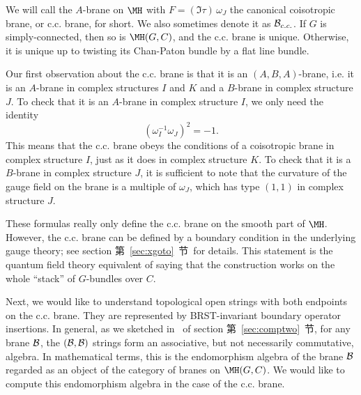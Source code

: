 We will call the $A$-brane on $\MH$ with $F=(\Im\tau)\,\omega_J$
the canonical coisotropic brane, or c.c. brane, for short. We also
sometimes denote it as ${\cal B}_{c.c.}$. If $G$ is
simply-connected, then so is $\MH(G,C)$, and the c.c. brane is
unique.  Otherwise, it is unique up to twisting its Chan-Paton
bundle by a flat line bundle.

Our first observation about the c.c. brane is that it is an
$(A,B,A)$-brane, i.e. it is an $A$-brane in complex structures $I$
and $K$ and a $B$-brane in complex structure $J$. To check that it
is an $A$-brane in complex structure $I$, we only need the
identity %
\begin{equation*}
\tag*{(11.5)}
(\omega_I^{-1}\omega_J)^2=-1.
\end{equation*}
 This means
that the c.c. brane obeys the conditions of a coisotropic brane in
complex structure $I$, just as it does in complex structure $K$.
To check that it is a $B$-brane in complex structure $J$, it is
sufficient to note that the curvature of the gauge field on the
brane is a multiple of  $\omega_J$, which has type $(1,1)$ in
complex structure $J$.

These formulas really only define the c.c. brane on the smooth
part of $\MH$.  However, the c.c. brane can be defined by a
boundary condition in the underlying gauge theory; see section
第~\ref{sec:xgoto}~节\ for details.  This statement is the quantum field theory
equivalent of saying that the construction works on the whole
``stack'' of $G$-bundles over $C$.

Next, we would like to understand topological open strings with
both endpoints on the c.c. brane. They are represented by
BRST-invariant boundary operator insertions.  In general, as we
sketched in \dunamp\ of section 第~\ref{sec:comptwo}~节, for any brane ${\cal
B}$, the $({\cal B},{\cal B})$ strings form an associative, but
not necessarily commutative, algebra. In mathematical terms, this
is the endomorphism algebra of the brane ${\cal B}$ regarded as an
object of the category of branes on $\MH(G,C)$. We would like to
compute this endomorphism algebra in the case of the c.c. brane.

